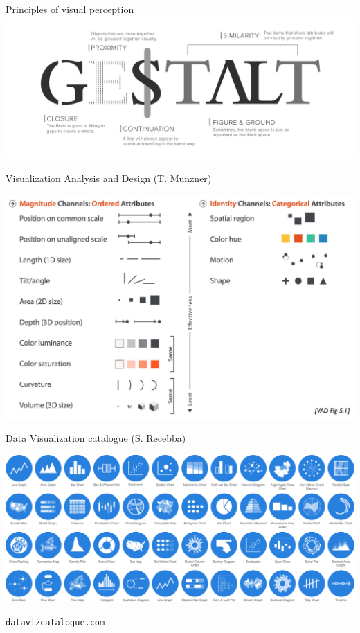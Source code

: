 \documentclass[10pt,aspectratio=169]{beamer}
\begin{document}
\begin{frame}{Principles of visual perception}
  \includegraphics[width=\textwidth]{gestalt.png}
\end{frame}

\begin{frame}{Visualization Analysis and Design (T. Munzner)}
  \begin{center}
    \includegraphics[width=.75\textwidth]{VAD.png}
  \end{center}
\end{frame}

\begin{frame}{Data Visualization catalogue (S. Recebba)}
  \begin{center}
    \href{https://datavizcatalogue.com/}{
    \includegraphics[width=\textwidth]{catalogue.png}}\\
  \end{center}
  {\tt datavizcatalogue.com}
\end{frame}
\end{document}
